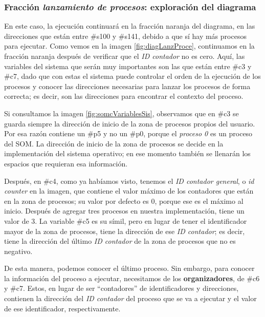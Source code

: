 \documentclass[letterpaper,12pt,oneside]{book}
\begin{document}
		
		


		\subsubsection{Fracción \textit{lanzamiento de procesos}: exploración del diagrama }		
		En este caso, la ejecución continuará en la fracción naranja del diagrama, en las direcciones que están entre \#s100 y \#s141, debido a que sí 
		hay más procesos para ejecutar. Como vemos en
		la imagen \ref{fig:diagLanzProce}, continuamos en la fracción naranja después de verificar que el \textit{ID contador} no es cero. Aquí,
		las variables del sistema que serán muy importantes son las que están entre \#c3 y \#c7, dado que con estas el sistema puede controlar el orden de la ejecución
		de los procesos y conocer las direcciones necesarias para lanzar los procesos de forma correcta; es decir, son las direcciones para encontrar
		el contexto del proceso. 
  
        Si consultamos la imagen \ref{fig:somcVariablesSis}, observamos que en \#c3 se guarda siempre la dirección de inicio de la
		zona de procesos propios del usuario. Por esa razón contiene un \#p5 y no un \#p0, porque el \textit{proceso 0} es un proceso del SOM. La 
		dirección de inicio de la zona de procesos se decide en la implementación del sistema operativo; en ese momento también
		se llenarán los espacios que requieran esa información.
  
        Después, en \#c4, como ya habíamos visto, tenemos el \textit{ID contador general}, o \textit{id counter} en la imagen, que
		contiene el valor máximo de los contadores que están en la zona de procesos; su valor por defecto es 0, porque ese es el máximo al inicio. 
		Después de agregar tres procesos 
		en nuestra implementación, tiene un valor de 3. La variable \#c5 es su símil, pero en lugar de tener el identificador mayor
		de la zona de procesos, tiene la dirección de ese \textit{ID contador}; 
		es decir, tiene la dirección del último \textit{ID contador} de la zona de procesos
		que no es negativo.
  
        De esta manera, podemos conocer el último proceso. Sin embargo, para conocer la información del proceso a ejecutar, necesitamos de los 
        \textbf{organizadores}, de \#c6 y \#c7. Estos, en lugar de ser ``contadores''
		de identificadores y direcciones, contienen la dirección del \textit{ID contador} del proceso que se va a ejecutar y el valor de ese 
		identificador, respectivamente.
		
\end{document}
